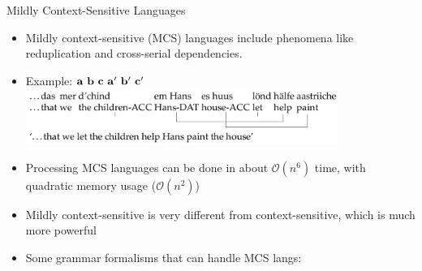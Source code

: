 \documentclass{beamer}
\newcommand{\detail}[1]{{\color{lightgrey}\small{}#1}}
\begin{document}
\begin{frame}{Mildly Context-Sensitive Languages}
\begin{itemize}
	\item Mildly context-sensitive (MCS) languages include phenomena like reduplication and cross-serial dependencies.
	\item Example: $\bf a \ b \ c \ a^{\prime} \ b^{\prime} \ c^{\prime}$
	\pause
	\includegraphics[width=0.80\textwidth]{images/swiss_cross_serial_deps.png}
	\pause
	\item Processing MCS languages can be done in about $\mathcal{O}(n^6)$ time, with quadratic memory usage \detail{($\mathcal{O}(n^2)$)}
	\pause
	\item {\small Mildly context-sensitive is very different from context-sensitive, which is much more powerful}
	\item Some grammar formalisms that can handle MCS langs:
	\begin{itemize}
	\end{itemize}
\end{itemize}
\end{frame}
\end{document}
